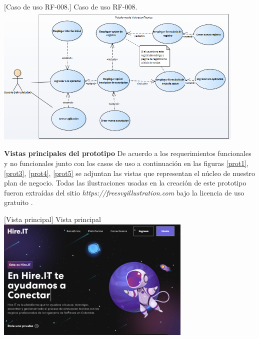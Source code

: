     \vspace{2mm}
    \begin{minipage}{0.9\textwidth}
    \centering
    [{Caso de uso RF-008.}]{ Caso de uso RF-008. }
    \label{caso8}
     \includegraphics[width=0.9\textwidth]{Images/casoUso8.png}
    \end{minipage}
    

\newline
\textbf{Vistas principales del prototipo}
De acuerdo a los requerimientos funcionales y no funcionales junto con los casos de uso a continuación en las figuras \ref{prot1}, \ref{prot3}, \ref{prot4}, \ref{prot5} se adjuntan las vistas que representan el núcleo de nuestro plan de negocio. Todas las ilustraciones usadas en la creación de este prototipo fueron extraídas del sitio \textit{https://freesvgillustration.com} bajo la licencia de uso gratuito \cite{illustrations}.

    \vspace{2mm}
    \begin{minipage}{0.9\textwidth}
    \centering
    [{Vista principal}]{ Vista principal }
    \label{prot1}
     \includegraphics[width=0.7\textwidth]{Images/prot1.png}
    \end{minipage}
    
